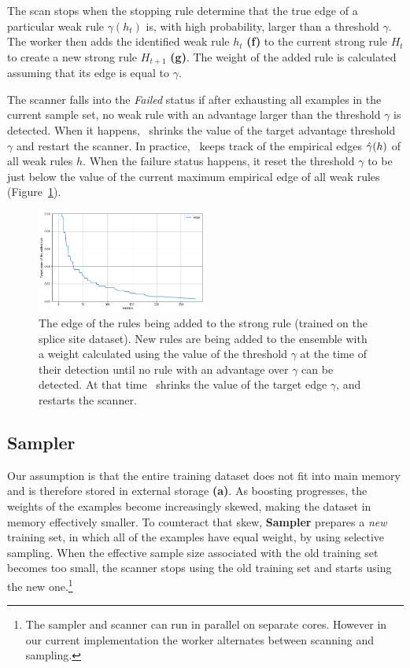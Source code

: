 The scan stops when the stopping rule determine that
the true edge of a particular weak rule
$\gamma(h_t)$ is, with high probability,
larger than a threshold $\gamma$. The
worker then adds the identified weak rule $h_t$ {\bf (f)} to the current
strong rule $H_t$ to create a new strong rule $H_{t+1}$ {\bf (g)}.
The weight of the added rule is calculated assuming that its edge is
equal to $\gamma$.

The scanner falls into the \textit{Failed} status if after exhausting
all examples in the current sample set, no weak rule with an advantage
larger than the threshold $\gamma$ is detected.
When it happens, \Sparrow\ shrinks the value of the target advantage
threshold $\gamma$ and restart the scanner.
In practice, \Sparrow\ keeps track of the empirical edges $\hat{\gamma}{(h)}$
of all weak rules $h$.
When the failure status happens, it reset the threshold $\gamma$
to be just below the value of the current maximum empirical edge of
all weak rules (Figure~\ref{fig:edge}).

\begin{figure}
\centering
    \includegraphics[width=0.5\textwidth]{figs/edge.png}
    \caption{The edge of the rules being added to the strong rule
    (trained on the splice site dataset).
    New rules are being added to the ensemble with a weight calculated
    using the value of the threshold $\gamma$ at the time of their
    detection until no rule with an advantage over $\gamma$ can be detected.
    At that time \Sparrow\ shrinks the value of the target edge $\gamma$,
    and restarts the scanner.\label{fig:edge}}
    \vspace{0pt}
\end{figure}


\subsection*{Sampler}

Our assumption is that the entire training dataset does
not fit into main memory and is therefore stored in external storage
{\bf (a)}. As boosting progresses, the weights of the examples become
increasingly skewed, making the dataset in memory effectively smaller.
To counteract that skew, {\bf Sampler} prepares a {\em new}
training set, in which all of the examples have equal weight, by using
selective sampling. When the effective sample size associated
with the old training set becomes too small, the scanner stops using
the old training set and starts using the new one.\footnote{The
  sampler and scanner can run in parallel on separate cores. However in
  our current implementation the worker alternates between scanning and
  sampling.}

